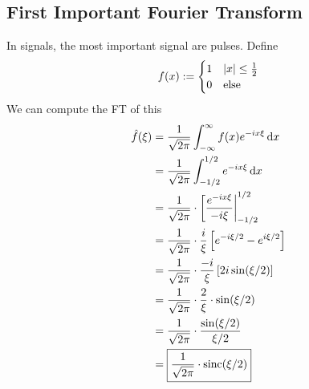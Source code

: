 \subsection{First Important Fourier Transform}
In signals, the most important signal are pulses. Define
\begin{align}
    f(x) := \begin{cases}
        1 & \abs{x} \le \frac{1}{2}\\
        0 & \text{else}
    \end{cases}
\end{align}
We can compute the FT of this
\begin{align}
    \hat{f}(\xi) &= \dfrac{1}{\sqrt{2\pi}} \int_{-\infty}^{\infty} f(x) e^{-ix\xi} \dd{x}\\
    &= \dfrac{1}{\sqrt{2\pi}} \int_{-1/2}^{1/2} e^{-ix\xi} \dd{x}\\
    &= \dfrac{1}{\sqrt{2\pi}} \cdot \eval[\dfrac{e^{-ix\xi}}{-i\xi}|_{-1/2}^{1/2}\\
    &= \dfrac{1}{\sqrt{2\pi}} \cdot \dfrac{i}{\xi} \left[ e^{-i\xi/2} - e^{i\xi/2} \right]\\
    &= \dfrac{1}{\sqrt{2\pi}} \cdot \dfrac{-i}{\xi} \left[ 2i\sin(\xi/2) \right]\\
    &= \dfrac{1}{\sqrt{2\pi}} \cdot \dfrac{2}{\xi} \cdot \sin(\xi/2)\\
    &= \dfrac{1}{\sqrt{2\pi}} \cdot \dfrac{\sin(\xi/2)}{\xi/2}\\
    &= \boxed{\dfrac{1}{\sqrt{2\pi}} \cdot \text{sinc}(\xi/2)}
\end{align}